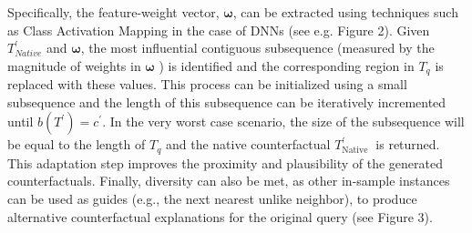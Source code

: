 Specifically, the feature-weight vector, $\boldsymbol{\omega}$, can be extracted using techniques such as Class Activation Mapping in the case of DNNs (see e.g. Figure 2). Given $T_{N a t i v e}^{\prime}$ and $\boldsymbol{\omega}$, the most influential contiguous subsequence (measured by the magnitude of weights in $\boldsymbol{\omega}$ ) is identified and the corresponding region in $T_{q}$ is replaced with these values. This process can be initialized using a small subsequence and the length of this subsequence can be iteratively incremented until $b\left(T^{\prime}\right)=c^{\prime}$. In the very worst case scenario, the size of the subsequence will be equal to the length of $T_{q}$ and the native counterfactual $T_{\text {Native }}^{\prime}$ is returned. This adaptation step improves the proximity and plausibility of the generated counterfactuals. Finally, diversity can also be met, as other in-sample instances can be used as guides (e.g., the next nearest unlike neighbor), to produce alternative counterfactual explanations for the original query (see Figure 3).



